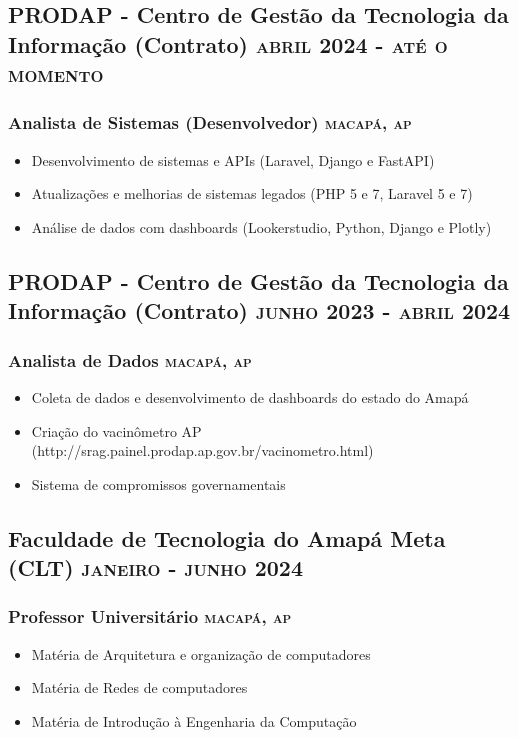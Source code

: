 \documentclass{article}
\newcommand{\rside}[1]{\hfill \normalfont\scshape\MakeLowercase{#1}}
\begin{document}
\subsection{PRODAP - Centro de Gestão da Tecnologia da Informação (Contrato) \rside{Abril 2024 - Até o momento}}
\subsubsection{Analista de Sistemas (Desenvolvedor) \rside{Macapá, AP}}
\begin{itemize}
  \item Desenvolvimento de sistemas e APIs (Laravel, Django e FastAPI)
  \item Atualizações e melhorias de sistemas legados (PHP 5 e 7, Laravel 5 e 7)
  \item Análise de dados com dashboards (Lookerstudio, Python, Django e Plotly)
\end{itemize}

\subsection{PRODAP - Centro de Gestão da Tecnologia da Informação (Contrato) \rside{Junho 2023 - Abril 2024}}
\subsubsection{ Analista de Dados  \rside{Macapá, AP}}
\begin{itemize}
  \item Coleta de dados e desenvolvimento de dashboards do estado do Amapá
  \item Criação do vacinômetro AP (http://srag.painel.prodap.ap.gov.br/vacinometro.html)
  \item Sistema de compromissos governamentais
\end{itemize}

\subsection{Faculdade de Tecnologia do Amapá Meta (CLT)  \rside{Janeiro - Junho 2024}}
\subsubsection{ Professor Universitário  \rside{Macapá, AP}}
\begin{itemize}
  \item Matéria de Arquitetura e organização de computadores
  \item Matéria de Redes de computadores
  \item Matéria de Introdução à Engenharia da Computação
\end{itemize}
\end{document}
